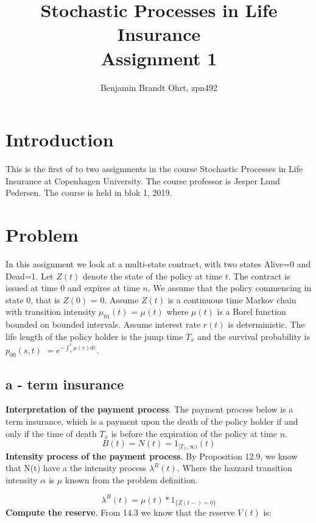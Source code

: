 \documentclass[12pt]{article}
\begin{document}
\title{Stochastic Processes in Life Insurance \\
\large Assignment 1}
\author{Benjamin Brandt Ohrt, zpn492}
\maketitle

\section{Introduction}
This is the first of to two assignments in the course Stochastic Processes in Life Insurance at Copenhagen University. The course professor is Jesper Lund Pedersen. The course is held in blok 1, 2019.

\section{Problem}
In this assignment we look at a multi-state contract, with two states Alive=0 and Dead=1. Let $Z(t)$ denote the state of the policy at time $t$. The contract is issued at time 0 and expires at time $n$. We assume that the policy commencing in state 0, that is $Z(0)$ = 0. Assume $Z(t)$ is a continuous time Markov chain with transition intensity $\mu_{01}(t)$ = $\mu(t)$ where $\mu(t)$ is a Borel function bounded on bounded intervals. Assume interest rate $r(t)$ is deterministic. The life length of the policy holder is the jump time $T_x$ and the survival probability is $p_{00}(s,t)$ $= e^{-\int_{s}^{t}\mu(v)dv}$.

\newpage

\subsection{a - term insurance}
\textbf{Interpretation of the payment process}.
The payment process below is a term insurance, which is a payment upon the death of the policy holder if and only if the time of death $T_x$ is before the expiration of the policy at time $n$.
\begin{equation}
B(t) = N(t) = 1_{[T_x,\infty)}(t)
\end{equation}
\textbf{Intensity process of the payment process}.
By Proposition 12.9\cite{jl}, we know that N(t) have a the intensity process $\lambda^B(t)$. Where the hazzard transition intensity $\alpha$ is $\mu$ known from the problem definition.

\begin{equation}
\lambda^B(t) = \mu(t) * 1_{\{Z(t-)=0\}}
\end{equation}
\textbf{Compute the reserve}. From 14.3\cite{jl} we know that the reserve $V(t)$ is:
\end{document}

